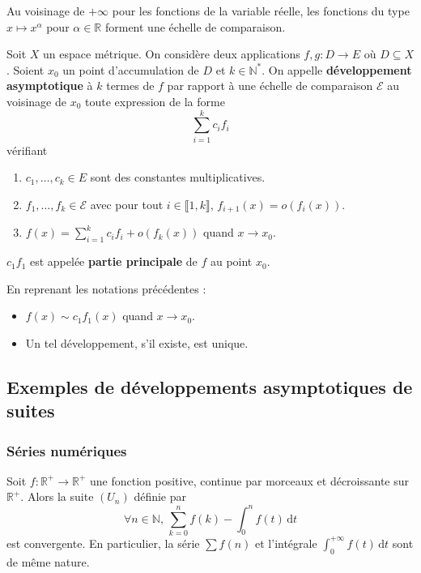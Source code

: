   \begin{example}
    Au voisinage de $+\infty$ pour les fonctions de la variable réelle, les fonctions du type $x \mapsto x^\alpha$ pour $\alpha \in \mathbb{R}$ forment une échelle de comparaison.
  \end{example}

  \begin{definition}
    Soit $X$ un espace métrique. On considère deux applications $f, g : D \rightarrow E$ où $D \subseteq X$. Soient $x_0$ un point d'accumulation de $D$ et $k \in \mathbb{N}^*$. On appelle \textbf{développement asymptotique} à $k$ termes de $f$ par rapport à une échelle de comparaison $\mathcal{E}$ au voisinage de $x_0$ toute expression de la forme
    \[ \sum_{i=1}^{k} c_i f_i \]
    vérifiant
    \begin{enumerate}[label={\bfseries(\roman*)}]
      \item $c_1, \dots, c_k \in E$ sont des constantes multiplicatives.
      \item $f_1, \dots, f_k \in \mathcal{E}$ avec pour tout $i \in \llbracket 1, k \rrbracket$, $f_{i+1}(x) = o(f_i(x))$.
      \item $f(x) = \sum_{i=1}^{k} c_i f_i + o(f_k(x))$ quand $x \rightarrow x_0$.
    \end{enumerate}
    $c_1 f_1$ est appelée \textbf{partie principale} de $f$ au point $x_0$.
  \end{definition}

  \begin{remark}
    En reprenant les notations précédentes :
    \begin{itemize}
      \item $f(x) \sim c_1 f_1(x)$ quand $x \rightarrow x_0$.
      \item Un tel développement, s'il existe, est unique.
    \end{itemize}
  \end{remark}

  \subsection{Exemples de développements asymptotiques de suites}

  \subsubsection{Séries numériques}


  \begin{proposition}
    Soit $f : \mathbb{R}^+ \rightarrow \mathbb{R}^+$ une fonction positive, continue par morceaux et décroissante sur $\mathbb{R}^+$. Alors la suite $(U_n)$ définie par
    \[ \forall n \in \mathbb{N}, \, \sum_{k=0}^n f(k) - \int_0^n f(t) \, \mathrm{d}t \]
    est convergente. En particulier, la série $\sum f(n)$ et l'intégrale $\int_0^{+\infty} f(t) \, \mathrm{d}t$ sont de même nature.
  \end{proposition}

